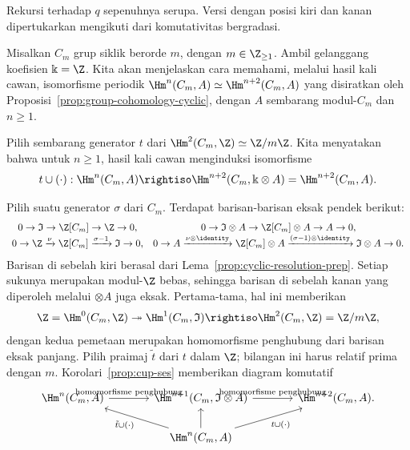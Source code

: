 \begin{bukti}
	Rekursi terhadap $q$ sepenuhnya serupa. Versi dengan posisi kiri dan kanan
	dipertukarkan mengikuti dari komutativitas bergradasi.
\end{bukti}

\begin{contoh}\label{eg:cup-periodicity}
	Misalkan $C_m$ grup siklik berorde $m$, dengan
	$m\in\Z_{\geq1}$. Ambil gelanggang koefisien $\Bbbk=\Z$. Kita akan
	menjelaskan cara memahami, melalui hasil kali cawan, isomorfisme periodik
	$\Hm^n(C_m,A)\simeq\Hm^{n+2}(C_m,A)$ yang disiratkan oleh
	Proposisi~\ref{prop:group-cohomology-cyclic}, dengan $A$ sembarang modul-$C_m$
	dan $n\geq1$.

	Pilih sembarang generator $t$ dari
	$\Hm^2(C_m,\Z)\simeq\Z/m\Z$. Kita menyatakan bahwa untuk $n\geq1$, hasil
	kali cawan menginduksi isomorfisme
	\[ t \cup (\cdot): \Hm^n(C_m, A) \rightiso \Hm^{n+2}(C_m, \Bbbk \otimes A) = \Hm^{n+2}(C_m, A). \]

	Pilih suatu generator $\sigma$ dari $C_m$. Terdapat barisan-barisan eksak
	pendek berikut:
	\[\begin{array}{cc}
		0 \to \mathfrak{I} \to \Z[C_m] \to \Z \to 0, & 0 \to \mathfrak{I} \otimes A \to \Z[C_m] \otimes A \to A \to 0, \\
		0 \to \Z \xrightarrow{\nu} \Z[C_m] \xrightarrow{\sigma - 1} \mathfrak{I} \to 0, & 0 \to A \xrightarrow{\nu \otimes \identity} \Z[C_m] \otimes A \xrightarrow{(\sigma-1) \otimes \identity} \mathfrak{I} \otimes A \to 0.
	\end{array}\]
	Barisan di sebelah kiri berasal dari Lema~\ref{prop:cyclic-resolution-prep}.
	Setiap sukunya merupakan modul-$\Z$ bebas, sehingga barisan di sebelah kanan
	yang diperoleh melalui $\otimes A$ juga eksak. Pertama-tama, hal ini
	memberikan
	\[ \Z = \Hm^0(C_m, \Z) \twoheadrightarrow \Hm^1(C_m, \mathfrak{I}) \rightiso \Hm^2(C_m, \Z) = \Z/m\Z, \]
	dengan kedua pemetaan merupakan homomorfisme penghubung dari barisan eksak
	panjang. Pilih praimaj $\tilde{t}$ dari $t$ dalam $\Z$; bilangan ini harus
	relatif prima dengan $m$. Korolari~\ref{prop:cup-ses} memberikan diagram
	komutatif
	\[\begin{tikzcd}[column sep=large]
		\Hm^n(C_m, A) \arrow[r, "\text{homomorfisme penghubung}"] & \Hm^{n+1}(C_m, \mathfrak{I} \otimes A) \arrow[r, "\text{homomorfisme penghubung}"] & \Hm^{n+2}(C_m, A). \\
		& \Hm^n(C_m, A) \arrow[lu, "{\tilde{t} \cup (\cdot)}"] \arrow[u] \arrow[ru, "{t \cup (\cdot)}"'] &
	\end{tikzcd}\]


\end{contoh}
